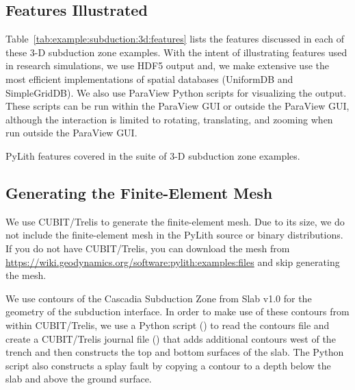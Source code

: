 \subsection{Features Illustrated}

Table~\vref{tab:example:subduction:3d:features} lists the features
discussed in each of these 3-D subduction zone examples. With the
intent of illustrating features used in research simulations, we use
HDF5 output and, we make extensive use the most efficient
implementations of spatial databases (UniformDB and SimpleGridDB). We
also use ParaView Python scripts for visualizing the output. These
scripts can be run within the ParaView GUI or outside the ParaView
GUI, although the interaction is limited to rotating, translating, and
zooming when run outside the ParaView GUI.

\begin{table}[htbp]
  \caption{PyLith features covered in the suite of 3-D subduction zone examples.}
  \label{tab:example:subduction:3d:features}
  
\end{table}

\subsection{Generating the Finite-Element Mesh}

We use CUBIT/Trelis to generate the finite-element mesh. Due to its
size, we do not include the finite-element mesh in the PyLith source
or binary distributions. If you do not have CUBIT/Trelis, you can
download the mesh from
\url{https://wiki.geodynamics.org/software:pylith:examples:files} and
skip generating the mesh.

We use contours of the Cascadia Subduction Zone from Slab v1.0
\cite{Hayes:etal:2012} for the geometry of the subduction interface. In
order to make use of these contours from within CUBIT/Trelis, we use a
Python script () to read the contours
file and create a CUBIT/Trelis journal file
() that adds additional contours west of
the trench and then constructs the top and bottom surfaces of the
slab. The Python script also constructs a splay fault by copying a
contour to a depth below the slab and above the ground surface.



